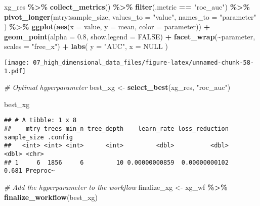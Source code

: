 \documentclass[
]{book}
\newenvironment{Shaded}{\begin{snugshade}}{\end{snugshade}}
\newcommand{\CommentTok}[1]{\textcolor[rgb]{0.56,0.35,0.01}{\textit{#1}}}
\newcommand{\DataTypeTok}[1]{\textcolor[rgb]{0.13,0.29,0.53}{#1}}
\newcommand{\FloatTok}[1]{\textcolor[rgb]{0.00,0.00,0.81}{#1}}
\newcommand{\KeywordTok}[1]{\textcolor[rgb]{0.13,0.29,0.53}{\textbf{#1}}}
\newcommand{\NormalTok}[1]{#1}
\newcommand{\OperatorTok}[1]{\textcolor[rgb]{0.81,0.36,0.00}{\textbf{#1}}}
\newcommand{\OtherTok}[1]{\textcolor[rgb]{0.56,0.35,0.01}{#1}}
\newcommand{\StringTok}[1]{\textcolor[rgb]{0.31,0.60,0.02}{#1}}
\begin{document}
\begin{Shaded}
\begin{Highlighting}[]
\NormalTok{xg\_res }\OperatorTok{\%\textgreater{}\%}
\StringTok{  }\KeywordTok{collect\_metrics}\NormalTok{() }\OperatorTok{\%\textgreater{}\%}
\StringTok{  }\KeywordTok{filter}\NormalTok{(.metric }\OperatorTok{==}\StringTok{ "roc\_auc"}\NormalTok{) }\OperatorTok{\%\textgreater{}\%}
\StringTok{  }\KeywordTok{pivot\_longer}\NormalTok{(mtry}\OperatorTok{:}\NormalTok{sample\_size,}
    \DataTypeTok{values\_to =} \StringTok{"value"}\NormalTok{,}
    \DataTypeTok{names\_to =} \StringTok{"parameter"}
\NormalTok{  ) }\OperatorTok{\%\textgreater{}\%}
\StringTok{  }\KeywordTok{ggplot}\NormalTok{(}\KeywordTok{aes}\NormalTok{(}\DataTypeTok{x =}\NormalTok{ value, }\DataTypeTok{y =}\NormalTok{ mean, }\DataTypeTok{color =}\NormalTok{ parameter)) }\OperatorTok{+}
\StringTok{  }\KeywordTok{geom\_point}\NormalTok{(}\DataTypeTok{alpha =} \FloatTok{0.8}\NormalTok{, }\DataTypeTok{show.legend =} \OtherTok{FALSE}\NormalTok{) }\OperatorTok{+}
\StringTok{  }\KeywordTok{facet\_wrap}\NormalTok{(}\OperatorTok{\textasciitilde{}}\NormalTok{parameter, }\DataTypeTok{scales =} \StringTok{"free\_x"}\NormalTok{) }\OperatorTok{+}
\StringTok{  }\KeywordTok{labs}\NormalTok{(}
    \DataTypeTok{y =} \StringTok{"AUC"}\NormalTok{,}
    \DataTypeTok{x =} \OtherTok{NULL}
\NormalTok{  )}
\end{Highlighting}
\end{Shaded}

\texttt{[image: 07\_high\_dimensional\_data\_files/figure-latex/unnamed-chunk-58-1.pdf]}

\begin{Shaded}
\begin{Highlighting}[]
\CommentTok{\# Optimal hyperparameter}
\NormalTok{best\_xg \textless{}{-}}\StringTok{ }\KeywordTok{select\_best}\NormalTok{(xg\_res, }\StringTok{"roc\_auc"}\NormalTok{)}

\NormalTok{best\_xg}
\end{Highlighting}
\end{Shaded}

\begin{verbatim}
## # A tibble: 1 x 8
##    mtry trees min_n tree_depth    learn_rate loss_reduction sample_size .config 
##   <int> <int> <int>      <int>         <dbl>          <dbl>       <dbl> <chr>   
## 1     6  1856     6         10 0.00000000859  0.00000000102       0.681 Preproc~
\end{verbatim}

\begin{Shaded}
\begin{Highlighting}[]
\CommentTok{\# Add the hyperparameter to the workflow}
\NormalTok{finalize\_xg \textless{}{-}}\StringTok{ }\NormalTok{xg\_wf }\OperatorTok{\%\textgreater{}\%}
\StringTok{  }\KeywordTok{finalize\_workflow}\NormalTok{(best\_xg)}
\end{Highlighting}
\end{Shaded}
\end{document}
